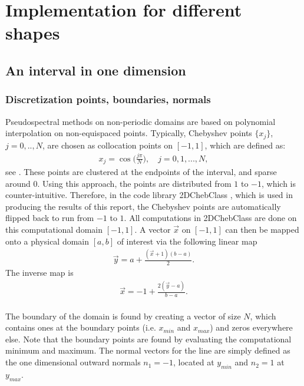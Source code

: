 \documentclass[11pt, a4paper]{article}
\theoremstyle{definition}
\begin{document}
\section{Implementation for different shapes}	
\subsection{An interval in one dimension}
\subsubsection{Discretization points, boundaries, normals}
Pseudospectral methods on non-periodic domains are based on polynomial interpolation on non-equispaced points.  
Typically, Chebyshev points $\{x_j\}$, $j = 0,..,N$, are chosen as collocation points on $[-1,1]$, which are defined as:
\begin{align}\label{defChebyshevPoints}
	x_j= \cos\bigg(\frac{j \pi}{N}\bigg), \quad j=0,1,...,N,
\end{align}	
see \cite{bibTrefethen}.
These points are clustered at the endpoints of the interval, and sparse around $0$. Using this approach, the points are distributed from $1$ to $-1$, which is counter-intuitive. Therefore, in the code library 2DChebClass \cite{GoddardPseudospectralCode1}, which is used in producing the results of this report, the Chebyshev points are automatically flipped back to run from $-1$ to $1$. All computations in 2DChebClass are done on this computational domain $[-1,1]$. A vector $\vec x$ on $[-1,1]$ can then be mapped onto a physical domain $[a,b]$ of interest via the following linear map
\begin{align}\label{eq:linearmap}
\vec y = a + \frac{(\vec x+1)(b-a)}{2}.  
\end{align}
The inverse map is 
\begin{align}\label{eq:invlinearmap}
\vec x = -1 + \frac{2(\vec y-a)}{b-a}.
\end{align}
\\
The boundary of the domain is found by creating a vector of size $N$, which contains ones at the boundary points (i.e. $x_{min}$ and $x_{max}$) and zeros everywhere else. Note that the boundary points are found by evaluating the computational minimum and maximum.
The normal vectors for the line are simply defined as the one dimensional outward normals $n_1 = -1$, located at $y_{min}$ and $n_2 = 1$ at $y_{max}$. 
\end{document}
